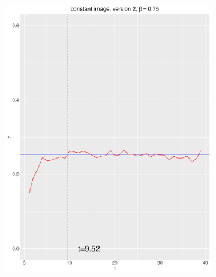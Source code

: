 \documentclass[12pt, oneside]{article}   	%
\begin{document}
\begin{figure}[H]
\begin{subfigure}[b]{0.475\textwidth}
            \includegraphics[width=\textwidth, height=0.32\textheight]{const_v2_75.pdf}
        \end{subfigure}
        \quad
        \begin{subfigure}[b]{0.475\textwidth}
            \centering

\end{subfigure}
\end{figure}
\end{document}
